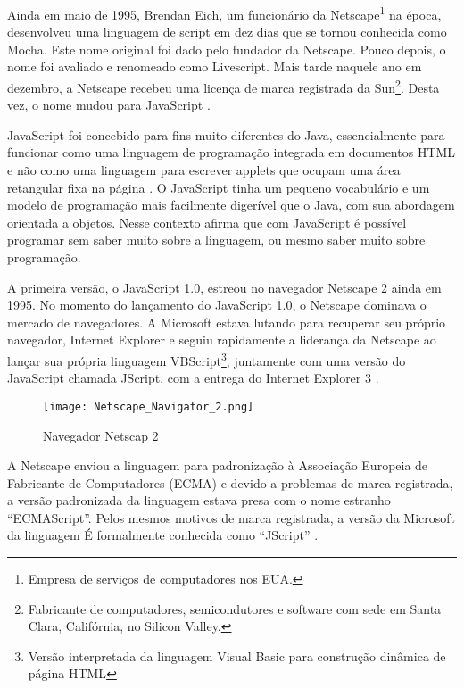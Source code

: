 Ainda em maio de 1995, Brendan Eich, um funcionário da Netscape\footnote{Empresa de serviços de computadores nos EUA.} na época, desenvolveu uma linguagem de script em dez dias que se tornou conhecida como Mocha. Este nome original foi dado pelo fundador da Netscape. Pouco depois, o nome foi avaliado e renomeado como Livescript. Mais tarde naquele ano em dezembro, a Netscape recebeu uma licença de marca registrada da Sun\footnote{Fabricante de computadores, semicondutores e software com sede em Santa Clara, Califórnia, no Silicon Valley.}. Desta vez, o nome mudou para JavaScript \cite{neer2013history}.

JavaScript foi concebido para fins muito diferentes do Java, essencialmente para funcionar como uma linguagem de programação integrada em documentos HTML e não como uma linguagem para escrever applets que ocupam uma área retangular fixa na página \cite{goodman2007javascript}. O JavaScript tinha um pequeno vocabulário e um modelo de programação mais facilmente digerível que o Java, com sua abordagem orientada a objetos. Nesse contexto  afirma que com JavaScript é possível programar sem saber muito sobre a linguagem, ou mesmo saber muito sobre programação.

A primeira versão, o JavaScript 1.0, estreou no navegador Netscape 2 ainda em 1995. No momento do lançamento do JavaScript 1.0, o Netscape dominava o mercado de navegadores. A Microsoft estava lutando para recuperar seu próprio navegador, Internet Explorer e seguiu rapidamente a liderança da Netscape ao lançar sua própria linguagem VBScript\footnote{Versão interpretada da linguagem Visual Basic para construção dinâmica de página HTML}, juntamente com uma versão do JavaScript chamada JScript, com a entrega do Internet Explorer 3 \cite{keith2010dom}.

\begin{figure}[!htb]
	\centering
	\texttt{[image: Netscape\_Navigator\_2.png]}
	\caption{Navegador Netscap 2}
	\label{fig:netscape}
\end{figure}

A Netscape enviou a linguagem para padronização à Associação Europeia de Fabricante de Computadores (ECMA) e devido a problemas de marca registrada, a versão padronizada da linguagem estava presa com o nome estranho “ECMAScript”. Pelos mesmos motivos de marca registrada, a versão da Microsoft da linguagem É formalmente conhecida como “JScript” \cite{flanagan2011javascript}.

